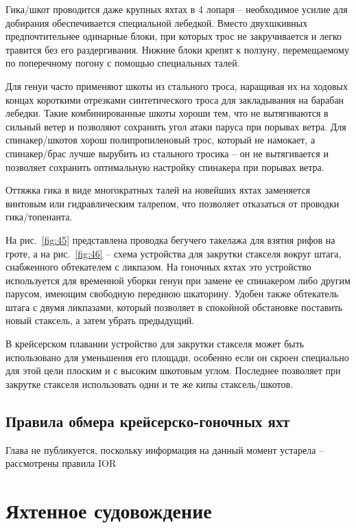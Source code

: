 \documentclass[a4paper, 12pt, twoside, final, book, russian, fittopage, cyremdash]{ncc}
\newcommand{\ris}[1]{\ref{fig:#1}}
\begin{document}
Гика\-/шкот проводится даже крупных яхтах в 4 лопаря \--- необходимое усилие для добирания обеспечивается специальной лебедкой. Вместо двухшкивных предпочтительнее одинарные блоки, при которых трос не закручивается и легко травится без его раздергивания. Нижние блоки крепят к ползуну, перемещаемому по поперечному погону с помощью специальных талей. 

Для генуи часто применяют шкоты из стального троса, наращивая их на ходовых концах короткими отрезками синтетического троса для закладывания на барабан лебедки. Такие комбинированные шкоты хороши тем, что не вытягиваются в сильный ветер и позволяют сохранить угол атаки паруса при порывах ветра. Для спинакер\-/шкотов хорош полипропиленовый трос, который не намокает, а спинакер\-/брас лучше вырубить из стального тросика \--- он не вытягивается и позволяет сохранить оптимальную настройку спинакера при порывах ветра. 

Оттяжка гика в виде многократных талей на новейших яхтах заменяется винтовым или гидравлическим талрепом, что позволяет отказаться от проводки гика\-/топенанта. 

На рис.~\ris{45} представлена проводка бегучего такелажа для взятия рифов на гроте, а на рис.~\ris{46} \--- схема устройства для закрутки стакселя вокруг штага, снабженного обтекателем с ликпазом. На гоночных яхтах это устройство используется для временной уборки генуи при замене ее спинакером либо другим парусом, имеющим свободную переднюю шкаторину. Удобен также обтекатель штага с двумя ликпазами, который позволяет в спокойной обстановке поставить новый стаксель, а затем убрать предыдущий. 

В крейсерском плавании устройство для закрутки стакселя может быть использовано для уменьшения его площади, особенно если он скроен специально для этой цели плоским и с высоким шкотовым углом. Последнее позволяет при закрутке стакселя использовать одни и те же кипы стаксель\-/шкотов. 

\chapter{Правила обмера крейсерско-гоночных яхт}\label{chap:4}

Глава не публикуется, поскольку информация на данный момент устарела \--- рассмотрены правила IOR

\part{Яхтенное судовождение}
\end{document}
